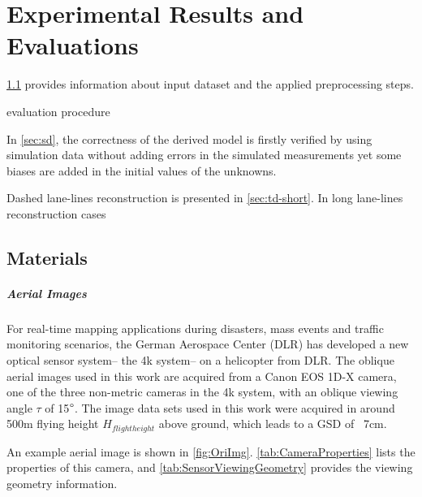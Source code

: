 \chapter{Experimental Results and Evaluations}
\label{chap:k3}

\cref{sec:Materials} provides information about input dataset and the applied preprocessing steps. 

evaluation procedure


In \cref{sec:sd}, the correctness of the derived model is firstly verified by using simulation data without adding errors in the simulated measurements yet some biases are added in the initial values of the unknowns.

Dashed lane-lines reconstruction is presented in \cref{sec:td-short}. %
In long lane-lines reconstruction cases

\section{Materials}
\label{sec:Materials}

\paragraph{Aerial Images}
For real-time mapping applications during disasters, mass events and traffic monitoring scenarios, the German Aerospace Center (DLR) has developed a new optical sensor system-- the 4k system-- on a helicopter from DLR. The oblique aerial images used in this work are acquired from a Canon EOS 1D-X camera, one of the three non-metric cameras in the 4k system, with an oblique viewing angle $\tau$ of 15$\degree$. The image data sets used in this work were acquired in around 500m flying height $H_{flight height}$ above ground, which leads to a GSD of ~7cm. %

An example aerial image is shown in \cref{fig:OriImg}. \cref{tab:CameraProperties} lists the properties of this camera, and \cref{tab:SensorViewingGeometry} provides the viewing geometry information.


